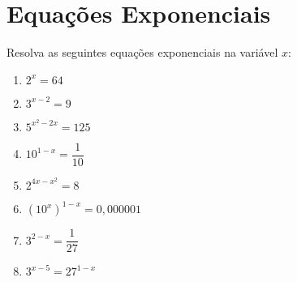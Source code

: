 \chapter{Equações Exponenciais}

	\item Resolva as seguintes equações exponenciais na variável $x$:
	\begin{multicols}{2}
	\begin{enumerate}
		\item $2^x = 64$
		\item $3^{x-2} = 9$
		\item $5^{x^2-2x} = 125$
		\item $10^{1-x} = \dfrac{1}{10}$
		\item $2^{4x-x^2} = 8$
		\item $\left(10^x\right)^{1-x} = 0,000001$
		\item $3^{2-x} = \dfrac{1}{27}$
		\item $3^{x-5} = 27^{1-x}$
	\end{enumerate}
	\end{multicols}
